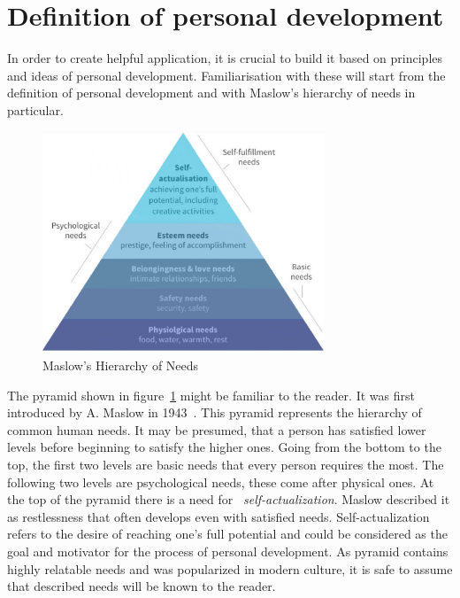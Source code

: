 
\section{Definition of personal development}\label{sec:definition-of-personal-development}

In order to create helpful application, it is crucial to build it based on principles and ideas of personal development.
Familiarisation with these will start from the definition of personal development and with Maslow's hierarchy of needs in particular.

\begin{figure}[h]
    \includegraphics[width=0.75\textwidth]{images/maslows.jpg}
    \caption{Maslow's Hierarchy of Needs~\cite{maslow-pyramid}}
    \label{fig:maslow-pyramid}
\end{figure}

The pyramid shown in figure~\ref{fig:maslow-pyramid} might be familiar to the reader.
It was first introduced by A. Maslow in 1943~\cite{maslow-motivation}.
This pyramid represents the hierarchy of common human needs.
It may be presumed, that a person has satisfied lower levels before beginning to satisfy the higher ones.
Going from the bottom to the top, the first two levels are basic needs that every person requires the most.
The following two levels are psychological needs, these come after physical ones.
At the top of the pyramid there is a need for ~\textit{self-actualization}.
Maslow described it as restlessness that often develops even with satisfied needs.
Self-actualization refers to the desire of reaching one's full potential and could be considered as the goal and motivator for the process of personal development.
As pyramid contains highly relatable needs and was popularized in modern culture, it is safe to assume that described needs will be known to the reader.

